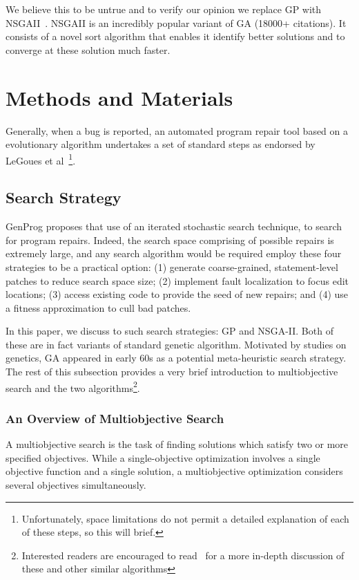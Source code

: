 \documentclass{sig-alternate}
\theoremstyle{break}
\begin{document}


We believe this to be untrue and to verify our opinion we replace GP with NSGAII~\cite{nsgaii}. NSGAII is an incredibly popular variant of GA (18000+ citations). It consists of a novel sort algorithm that enables it identify better solutions and to converge at these solution much faster.  

\section{Methods and Materials}
\label{prelim}
Generally, when a bug is reported, an automated program repair tool based on a evolutionary algorithm undertakes a set of standard steps as endorsed by LeGoues et al~\cite{Goues}\footnote{Unfortunately, space limitations do not permit a detailed explanation of each of these steps, so this will brief.}.   


\subsection{Search Strategy}

GenProg proposes that use of an iterated stochastic search technique, to search for program repairs. Indeed, the search space comprising of possible repairs is extremely large, and any search algorithm would be required employ these four strategies to be a practical option: (1) generate coarse-grained, statement-level patches to reduce search space size; (2) implement fault localization to focus edit locations; (3) access existing code to provide the seed of new repairs; and (4) use a fitness approximation to cull bad patches.

In this paper, we discuss to such search strategies: GP and NSGA-II. Both of these are in fact variants of standard genetic algorithm. Motivated by studies on genetics, GA appeared in early 60s as a potential meta-heuristic search strategy. The rest of this subsection provides a very brief introduction to multiobjective search and the two algorithms\footnote{Interested readers are encouraged to read~\cite{clever} for a more in-depth discussion of these and other similar algorithms}.


\subsubsection{An Overview of Multiobjective Search}
\label{mos}
A multiobjective search is the task of finding solutions which satisfy two or more specified objectives. While a single-objective optimization involves a single objective function and a single solution, a multiobjective optimization considers several objectives simultaneously. 
\end{document}
